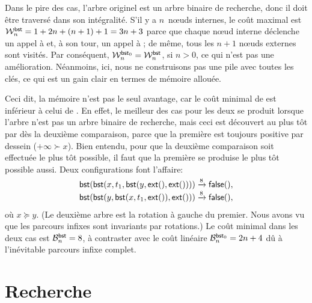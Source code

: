 Dans le pire des cas, l'arbre originel est un arbre binaire de
recherche, donc il doit être traversé dans son intégralité. S'il y a
\(n\)~nœuds internes, le coût maximal est \(\W{\fun{bst}}{n} = 1 +
2n + (n+1) + 1 = 3n + 3\) parce que
chaque nœud interne déclenche un appel à
 et, à son tour, un
appel à ; de même, tous les \(n+1\)
nœuds externes sont visités. Par conséquent, \(\W{\fun{bst}_0}{n}
= \W{\fun{bst}}{n}\), si \(n > 0\),
ce qui n'est pas une amélioration. Néanmoins, ici, nous ne
construisons pas une pile avec toutes les clés, ce qui est un gain
clair en termes de mémoire allouée.

Ceci dit, la mémoire n'est pas le seul avantage, car le coût minimal
de  est inférieur à celui de
. En effet, le meilleur
des cas pour les deux se produit lorsque l'arbre n'est pas un arbre
binaire de recherche, mais ceci est découvert au plus tôt par
 dès la deuxième comparaison, parce que la première est
toujours positive par dessein (\(+\infty \succ x\)). Bien entendu,
pour que la deuxième comparaison soit effectuée le plus tôt possible,
il faut que la première se produise le plus tôt possible aussi. Deux
configurations font l'affaire:
\begin{align*}
\fun{bst}(\fun{bst}(x,t_1,\fun{bst}(y,\fun{ext}(),\fun{ext}())))
& \xrightarrow{\smash{8}} \fun{false}(),\\
\fun{bst}(\fun{bst}(y,\fun{bst}(x,t_1,\fun{ext}()),\fun{ext}()))
& \xrightarrow{\smash{8}} \fun{false}(),
\end{align*}
où \(x \succcurlyeq y\). (Le deuxième arbre est la rotation à gauche
du premier. Nous avons vu  que les parcours
infixes sont invariants par rotations.) Le coût minimal dans les deux
cas est \(\B{\fun{bst}}{n} = 8\), à
contraster avec le coût linéaire \(\B{\fun{bst}_0}{n} = 2n +
4\) dû à l'inévitable parcours infixe
complet.

\section{Recherche}

